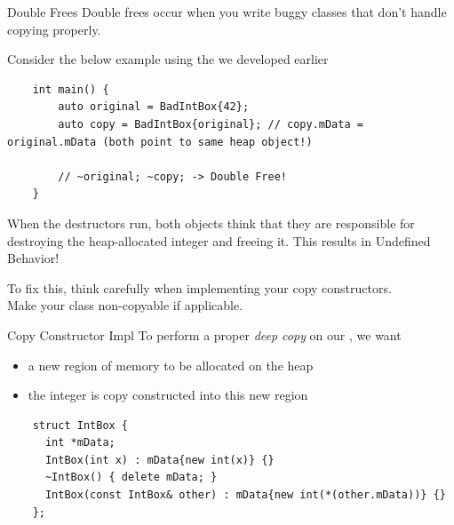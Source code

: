 \begin{frame}[fragile]{Double Frees}
  Double frees occur when you write buggy classes that don't handle copying properly.

  Consider the below example using the  we developed earlier
  \begin{verbatim}
    int main() {
        auto original = BadIntBox{42};
        auto copy = BadIntBox{original}; // copy.mData = original.mData (both point to same heap object!)
    
        // ~original; ~copy; -> Double Free!
    }
  \end{verbatim}
  When the destructors run, both objects think that they are responsible for destroying
  the heap-allocated integer and freeing it. This results in Undefined Behavior!
  
  To fix this, think carefully when implementing your copy constructors.\\
  Make your class non-copyable if applicable.
\end{frame}

\begin{frame}[fragile]{Copy Constructor Impl}
  To perform a proper \emph{deep copy} on our , we want
  \begin{itemize}
    \item a new region of memory to be allocated on the heap
    \item the  integer is copy constructed into this new region
  \end{itemize}

  \begin{verbatim}
    struct IntBox {
      int *mData;
      IntBox(int x) : mData{new int(x)} {}
      ~IntBox() { delete mData; }
      IntBox(const IntBox& other) : mData{new int(*(other.mData))} {}
    };
  \end{verbatim}
\end{frame}

